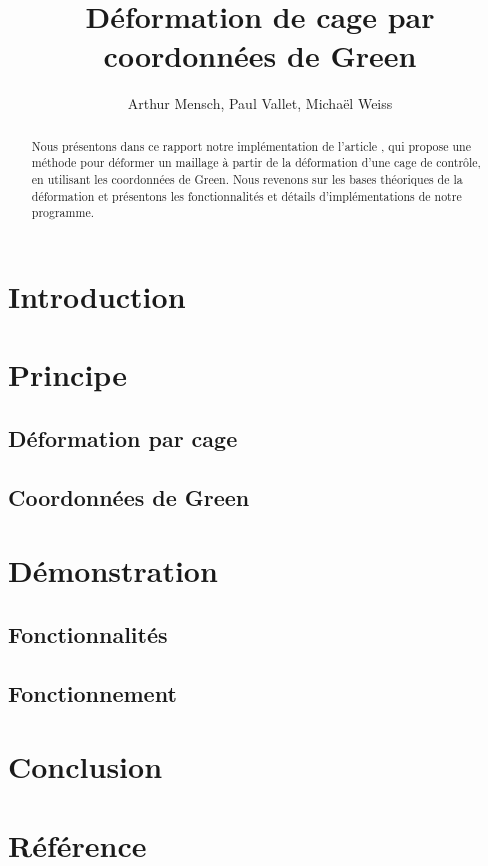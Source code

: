 \documentclass[10pt,a4paper]{article}
\author{Arthur Mensch, Paul Vallet, Michaël Weiss}
\title{Déformation de cage par coordonnées de Green}
\begin{document}
\maketitle
\begin{abstract}
Nous présentons dans ce rapport notre implémentation de l'article \cite{lipman2008green}, qui propose une méthode pour déformer un maillage à partir de la déformation d'une cage de contrôle, en utilisant les coordonnées de Green. Nous revenons sur les bases théoriques de la déformation et présentons les fonctionnalités et détails d'implémentations de notre programme.
\end{abstract}
\section*{Introduction}



\section{Principe}

\subsection{Déformation par cage}

\subsection{Coordonnées de Green}

\section{Démonstration}

\subsection{Fonctionnalités}

\subsection{Fonctionnement}

\section*{Conclusion}

\section*{Référence}




\end{document}
